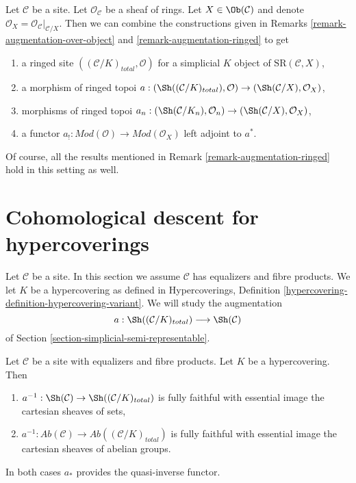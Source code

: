 \begin{remark}
\label{remark-augmentation-ringed-over-object}
Let $\mathcal{C}$ be a site. Let $\mathcal{O}_\mathcal{C}$ be a sheaf of rings.
Let $X \in \Ob(\mathcal{C})$ and denote
$\mathcal{O}_X = \mathcal{O}_\mathcal{C}|_{\mathcal{C}/X}$.
Then we can combine the constructions given in
Remarks \ref{remark-augmentation-over-object} and
\ref{remark-augmentation-ringed}
to get
\begin{enumerate}
\item a ringed site $((\mathcal{C}/K)_{total}, \mathcal{O})$
for a simplicial $K$ object of $\text{SR}(\mathcal{C}, X)$,
\item a morphism of ringed topoi
$a : (\Sh((\mathcal{C}/K)_{total}), \mathcal{O}) \to
(\Sh(\mathcal{C}/X), \mathcal{O}_X)$,
\item morphisms of ringed topoi
$a_n : (\Sh(\mathcal{C}/K_n), \mathcal{O}_n) \to
(\Sh(\mathcal{C}/X), \mathcal{O}_X)$,
\item a functor
$a_! : \textit{Mod}(\mathcal{O}) \to \textit{Mod}(\mathcal{O}_X)$
left adjoint to $a^*$.
\end{enumerate}
Of course, all the results mentioned in
Remark \ref{remark-augmentation-ringed}
hold in this setting as well.
\end{remark}






\section{Cohomological descent for hypercoverings}
\label{section-cohomological-descent-hypercoverings}

\noindent
Let $\mathcal{C}$ be a site. In this section we assume $\mathcal{C}$
has equalizers and fibre products. We let $K$ be a hypercovering
as defined in Hypercoverings, Definition
\ref{hypercovering-definition-hypercovering-variant}. We will study
the augmentation
$$
a : \Sh((\mathcal{C}/K)_{total}) \longrightarrow \Sh(\mathcal{C})
$$
of Section \ref{section-simplicial-semi-representable}.

\begin{lemma}
\label{lemma-hypercovering-descent-sheaves}
Let $\mathcal{C}$ be a site with equalizers and fibre products.
Let $K$ be a hypercovering. Then
\begin{enumerate}
\item $a^{-1} : \Sh(\mathcal{C}) \to \Sh((\mathcal{C}/K)_{total})$
is fully faithful with essential image the cartesian sheaves of sets,
\item $a^{-1} : \textit{Ab}(\mathcal{C}) \to
\textit{Ab}((\mathcal{C}/K)_{total})$
is fully faithful with essential image the cartesian sheaves
of abelian groups.
\end{enumerate}
In both cases $a_*$ provides the quasi-inverse functor.
\end{lemma}

